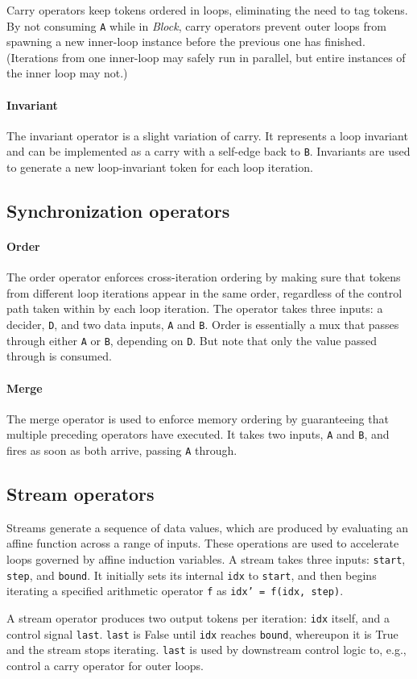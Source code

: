 Carry operators keep tokens ordered in loops, eliminating the need to tag tokens.
%
By not consuming {\tt A} while in {\em Block}, carry operators prevent
outer loops from spawning a new inner-loop instance before the
previous one has finished.
%
(Iterations from one inner-loop may safely run in parallel, but entire
instances of the inner loop may not.)

\paragraph{Invariant}
The invariant operator is a slight variation of carry.
%
It represents a loop invariant and can be implemented as a carry with a self-edge back to {\tt B}.
%
Invariants are used to generate a new loop-invariant token for each loop iteration.

\subsection{Synchronization operators}

\paragraph{Order}
The order operator enforces cross-iteration ordering by making sure that tokens from different loop iterations
appear in the same order, regardless of the control path taken within by each loop iteration.
% 
The operator takes three inputs: a decider, {\tt D}, and two data inputs, {\tt A} and {\tt B}.
%
Order is essentially a mux that passes through either {\tt A} or {\tt B}, depending on {\tt D}.
%
But note that only the value passed through is consumed.

\paragraph{Merge}
The merge operator is used to enforce memory ordering by guaranteeing that multiple preceding operators have executed.
% 
It takes two inputs, {\tt A} and {\tt B}, and fires as soon as both arrive, passing {\tt A} through.

\figRipTideCFGates

\subsection{Stream operators}
Streams generate a sequence of data values, which are 
produced by evaluating an affine function
across a range of inputs. 
%
These operations are used to accelerate loops
governed by affine induction variables.
%
A stream takes three inputs: {\tt start}, {\tt step}, and {\tt bound}.
It initially sets its internal {\tt idx} to {\tt start},
%
and then begins iterating a specified arithmetic operator {\tt f}
as {\tt idx' = f(idx, step)}.

A stream operator produces two output tokens per iteration: {\tt idx} itself,
and a control signal {\tt last}.
%
{\tt last} is False until {\tt idx} reaches {\tt bound},
whereupon it is True and the stream stops iterating.
%
{\tt last} is used by downstream control logic to, e.g., control
a carry operator for outer loops.
